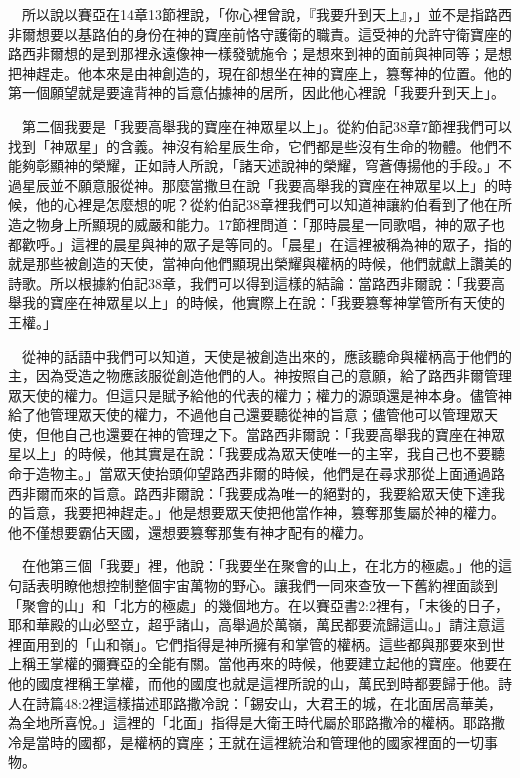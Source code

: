 \documentclass{book}
\begin{document}
　所以說以賽亞在14章13節裡說，「你心裡曾說，『我要升到天上』，」並不是指路西非爾想要以基路伯的身份在神的寶座前恪守護衛的職責。這受神的允許守衛寶座的路西非爾想的是到那裡永遠像神一樣發號施令；是想來到神的面前與神同等；是想把神趕走。他本來是由神創造的，現在卻想坐在神的寶座上，篡奪神的位置。他的第一個願望就是要違背神的旨意佔據神的居所，因此他心裡說「我要升到天上」。

　第二個我要是「我要高舉我的寶座在神眾星以上」。從約伯記38章7節裡我們可以找到「神眾星」的含義。神沒有給星辰生命，它們都是些沒有生命的物體。他們不能夠彰顯神的榮耀，正如詩人所說，「諸天述說神的榮耀，穹蒼傳揚他的手段。」不過星辰並不願意服從神。那麼當撒旦在說「我要高舉我的寶座在神眾星以上」的時候，他的心裡是怎麼想的呢？從約伯記38章裡我們可以知道神讓約伯看到了他在所造之物身上所顯現的威嚴和能力。17節裡問道：「那時晨星一同歌唱，神的眾子也都歡呼。」這裡的晨星與神的眾子是等同的。「晨星」在這裡被稱為神的眾子，指的就是那些被創造的天使，當神向他們顯現出榮耀與權柄的時候，他們就獻上讚美的詩歌。所以根據約伯記38章，我們可以得到這樣的結論：當路西非爾說：「我要高舉我的寶座在神眾星以上」的時候，他實際上在說：「我要篡奪神掌管所有天使的王權。」

　從神的話語中我們可以知道，天使是被創造出來的，應該聽命與權柄高于他們的主，因為受造之物應該服從創造他們的人。神按照自己的意願，給了路西非爾管理眾天使的權力。但這只是賦予給他的代表的權力；權力的源頭還是神本身。儘管神給了他管理眾天使的權力，不過他自己還要聽從神的旨意；儘管他可以管理眾天使，但他自己也還要在神的管理之下。當路西非爾說：「我要高舉我的寶座在神眾星以上」的時候，他其實是在說：「我要成為眾天使唯一的主宰，我自己也不要聽命于造物主。」當眾天使抬頭仰望路西非爾的時候，他們是在尋求那從上面通過路西非爾而來的旨意。路西非爾說：「我要成為唯一的絕對的，我要給眾天使下達我的旨意，我要把神趕走。」他是想要眾天使把他當作神，篡奪那隻屬於神的權力。他不僅想要霸佔天國，還想要篡奪那隻有神才配有的權力。

　在他第三個「我要」裡，他說：「我要坐在聚會的山上，在北方的極處。」他的這句話表明瞭他想控制整個宇宙萬物的野心。讓我們一同來查攷一下舊約裡面談到「聚會的山」和「北方的極處」的幾個地方。在以賽亞書2:2裡有，「末後的日子，耶和華殿的山必堅立，超乎諸山，高舉過於萬嶺，萬民都要流歸這山。」請注意這裡面用到的「山和嶺」。它們指得是神所擁有和掌管的權柄。這些都與那要來到世上稱王掌權的彌賽亞的全能有關。當他再來的時候，他要建立起他的寶座。他要在他的國度裡稱王掌權，而他的國度也就是這裡所說的山，萬民到時都要歸于他。詩人在詩篇48:2裡這樣描述耶路撒冷說：「錫安山，大君王的城，在北面居高華美，為全地所喜悅。」這裡的「北面」指得是大衛王時代屬於耶路撒冷的權柄。耶路撒冷是當時的國都，是權柄的寶座；王就在這裡統治和管理他的國家裡面的一切事物。
\end{document}
